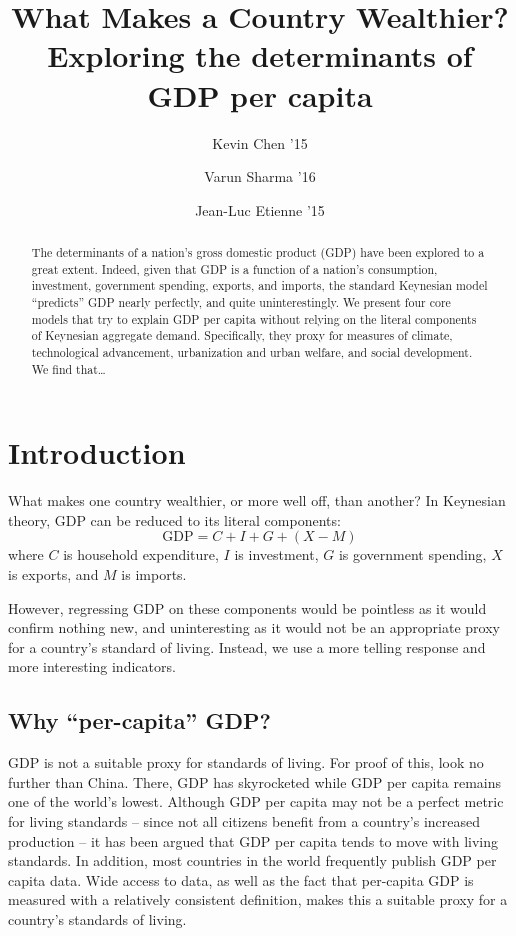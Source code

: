 \documentclass[12pt]{article}
\title{
  \sc
  What Makes a Country Wealthier? \\
  {\large Exploring the determinants of GDP per capita}
}
\author{
    {\rm Kevin Chen '15} \\ 
    \and
    {\rm Varun Sharma '16} \\ 
    \and
    {\rm Jean-Luc Etienne '15} \\ 
}
\begin{document}
\date{}
\maketitle
\doublespacing


\begin{abstract}
The determinants of a nation's gross domestic product (GDP) have been explored to a great extent. Indeed, given that GDP is a function of a nation's consumption, investment, government spending, exports, and imports, the standard Keynesian model ``predicts'' GDP nearly perfectly, and quite uninterestingly. We present four core models that try to explain GDP per capita without relying on the literal components of Keynesian aggregate demand. Specifically, they proxy for measures of climate, technological advancement, urbanization and urban welfare, and social development.
We find that\dots %
\end{abstract}

\newpage


\section{Introduction}
What makes one country wealthier, or more well off, than another? In Keynesian theory, GDP can be reduced to its literal components:
$$\mathrm{GDP} = C + I + G + (X - M)$$
where $C$ is household expenditure, $I$ is investment,  $G$ is government spending, $X$ is exports, and $M$ is imports.

However, regressing GDP on these components would be pointless as it would confirm nothing new, and uninteresting as it would not be an appropriate proxy for a country's standard of living. Instead, we use a more telling response and more interesting indicators.

\subsection{Why ``per-capita'' GDP?}
GDP is not a suitable proxy for standards of living. For proof of this, look no further than China. There, GDP has skyrocketed while GDP per capita remains one of the world's lowest. Although GDP per capita may not be a perfect metric for living standards -- since not all citizens benefit from a country's increased production -- it has been argued that GDP per capita tends to move with living standards. In addition, most countries in the world frequently publish GDP per capita data. Wide access to data, as well as the fact that per-capita GDP is measured with a relatively consistent definition, makes this a suitable proxy for a country's standards of living.
\end{document}
